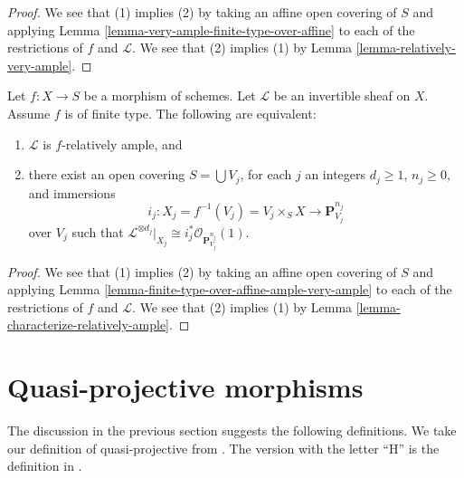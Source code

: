 \begin{proof}
We see that (1) implies (2) by taking an affine open covering of $S$
and applying Lemma \ref{lemma-very-ample-finite-type-over-affine} to
each of the restrictions of $f$ and
$\mathcal{L}$. We see that (2) implies (1) by
Lemma \ref{lemma-relatively-very-ample}.
\end{proof}

\begin{lemma}
\label{lemma-characterize-ample-on-finite-type}
Let $f : X \to S$ be a morphism of schemes.
Let $\mathcal{L}$ be an invertible sheaf on $X$.
Assume $f$ is of finite type.
The following are equivalent:
\begin{enumerate}
\item $\mathcal{L}$ is $f$-relatively ample, and
\item there exist an open covering $S = \bigcup V_j$,
for each $j$ an integers $d_j \geq 1$,
$n_j \geq 0$, and immersions
$$
i_j :
X_j = f^{-1}(V_j) = V_j \times_S X
\longrightarrow
\mathbf{P}^{n_j}_{V_j}
$$
over $V_j$ such that
$\mathcal{L}^{\otimes d_j}|_{X_j} \cong
i_j^*\mathcal{O}_{\mathbf{P}^{n_j}_{V_j}}(1)$.
\end{enumerate}
\end{lemma}

\begin{proof}
We see that (1) implies (2) by taking an affine open covering of $S$
and applying Lemma \ref{lemma-finite-type-over-affine-ample-very-ample} to
each of the restrictions of $f$ and
$\mathcal{L}$. We see that (2) implies (1) by
Lemma \ref{lemma-characterize-relatively-ample}.
\end{proof}










\section{Quasi-projective morphisms}
\label{section-quasi-projective}

\noindent
The discussion in the previous section suggests the following definitions.
We take our definition of quasi-projective from \cite{EGA}. The version
with the letter ``H'' is the definition in \cite{H}.

